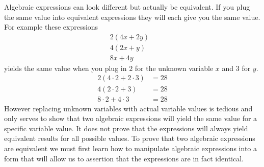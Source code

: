 Algebraic expressions can look different but actually be equivalent. If you plug the same value into equivalent expressions they will each give you the same value. For example these expressions
\begin{align*}
2(4x+2y) &   \\
4(2x+y)  &  \\
8x+4y         &
\end{align*}
yields the same value when you plug in $2$ for the unknown variable $x$ and $3$ for $y$.
\begin{align*}
2(4 \cdot 2 + 2 \cdot 3)  &= 28\\
4(2 \cdot 2 + 3)          &= 28\\
8 \cdot 2 + 4 \cdot 3     &= 28
\end{align*}
However replacing unknown variables with actual variable values is tedious and only serves to show that two algebraic expressions will yield the same value for a specific variable value. It does not prove that the expressions will always yield equivalent results for all possible values. To prove that two algebraic expressions are equivalent we must first learn how to manipulate algebraic expressions into a form that will allow us to assertion that the expressions are in fact identical.

